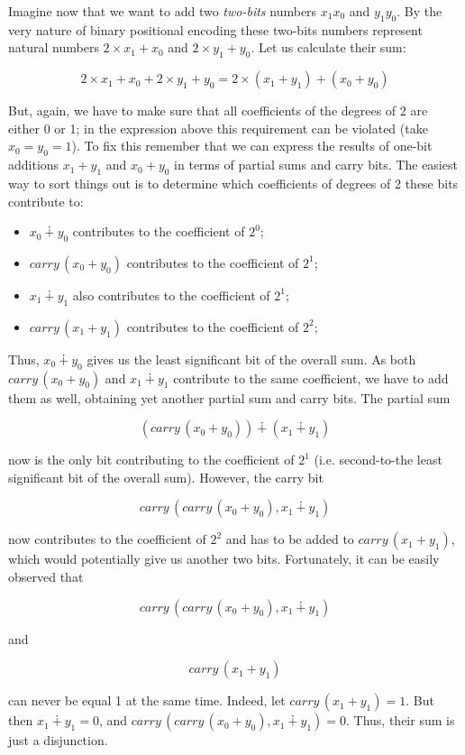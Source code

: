 Imagine now that we want to add two \emph{two-bits} numbers $x_1x_0$ and $y_1y_0$. By the very nature of
binary positional encoding these two-bits numbers represent natural numbers $2\times x_1+x_0$ and
$2\times y_1+y_0$. Let us calculate their sum:

\[
2\times x_1 + x_0 + 2\times y_1+y_0 = 2\times (x_1+y_1) + (x_0+y_0)
\]

But, again, we have to make sure that all coefficients of the degrees of 2 are either 0 or 1; in the
expression above this requirement can be violated (take $x_0=y_0=1$). To fix this remember that we
can express the results of one-bit additions $x_1+y_1$ and $x_0+y_0$ in terms of partial sums and carry bits.
The easiest way to sort things out is to determine which coefficients of degrees of 2 these bits
contribute to:

\begin{itemize}
\item $x_0\dotplus y_0$ contributes to the coefficient of $2^0$;
\item $carry\,(x_0+y_0)$ contributes to the coefficient of $2^1$;
\item $x_1\dotplus y_1$ also contributes to the coefficient of $2^1$;
\item $carry\,(x_1+ y_1)$ contributes to the coefficient of $2^2$;
\end{itemize}

Thus, $x_0\dotplus y_0$ gives us the least significant bit of the overall sum. As both $carry\,(x_0+y_0)$ and 
$x_1\dotplus y_1$ contribute to the same coefficient, we have to add them as well, obtaining yet another
partial sum and carry bits. The partial sum

\[
(carry\,(x_0+y_0))\dotplus(x_1\dotplus y_1)
\]

now is the only bit contributing to the coefficient of $2^1$ (i.e. second-to-the least significant bit of the
overall sum). However, the carry bit

\[
carry\,(carry\,(x_0+y_0), x_1\dotplus y_1)
\]

now contributes to the coefficient of $2^2$ and has to be added to $carry\,(x_1+ y_1)$, which would potentially
give us another two bits. Fortunately, it can be easily observed that

\[
carry\,(carry\,(x_0+y_0), x_1\dotplus y_1)
\]

and

\[
carry\,(x_1+y_1)
\]

can never be equal 1 at the same time. Indeed, let $carry\,(x_1+y_1)=1$. But then $x_1\dotplus y_1=0$, and
$carry\,(carry\,(x_0+y_0), x_1\dotplus y_1)=0$. Thus, their sum is just a disjunction.

